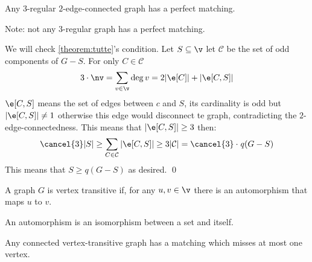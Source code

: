 \begin{customlemma}{2.9}
\label{lemma:2.9}
    Any $3$-regular $2$-edge-connected graph has a perfect matching.
\end{customlemma}
Note: not any $3$-regular graph has a perfect matching.
\begin{prf}
    We will check \ref{theorem:tutte}'s condition. Let $S \subseteq \v$ let $\mathcal{C}$ be the set of odd components of $G - S$. For only $C \in \mathcal{C}$
    \begin{equation*}
        3 \cdot \nv = \sum_{v \in \v}\deg{v} = 2|\e[C]| + |\e[C, S]|
    \end{equation*}
    $\e[C, S]$ means the set of edges between $c$ and $S$, its cardinality is odd but $|\e[C, S]| \neq 1$ otherwise this edge would disconnect te graph, contradicting the $2$-edge-connectedness. This means that $|\e[C, S]| \geq 3$ then:
    \begin{equation*}
        \cancel{3}|S| \geq \sum_{C \in \mathcal{C}}{|\e[C, S]| \geq 3|\mathcal{C}| = \cancel{3} \cdot \mathit{q}(G - S)}
    \end{equation*}
    This means that $S \geq \mathit{q}(G - S)$ as desired. \qed
\end{prf}
A graph $G$ is vertex transitive if, for any $u, v \in \v$ there is an automorphism that maps $u$ to $v$.
\begin{definition}[Automorphism]
    An automorphism is an isomorphism between a set and itself.    
\end{definition}
\begin{customtheorem}{2.10}
\label{theorem:2.10}
    Any connected vertex-transitive graph has a matching which misses at most one vertex.
\end{customtheorem}
